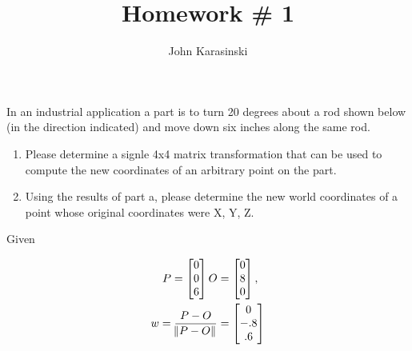 \documentclass[onecolumn,10pt]{jhwhw}
\author{John Karasinski}
\title{Homework \# 1}
\begin{document}

\problem{}
In an industrial application a part is to turn 20 degrees about a rod shown below (in the direction indicated) and move down six inches along the same rod.
\begin{enumerate}
    \item Please determine a signle 4x4 matrix transformation that can be used to compute the new coordinates of an arbitrary point on the part.
    \item Using the results of part a, please determine the new world coordinates of a point whose original coordinates were X, Y, Z.
\end{enumerate}

Given


\begin{align*}
P = 
\begin{bmatrix*}[c]
0 \\
0 \\
6
\end{bmatrix*}
O &=
\begin{bmatrix*}[c]
0 \\
8 \\
0
\end{bmatrix*},\\
w = \dfrac{P - O}{\norm{P - O}} &=
\begin{bmatrix*}[c]
0 \\
-.8 \\
.6
\end{bmatrix*}
\end{align*}


\end{document}
